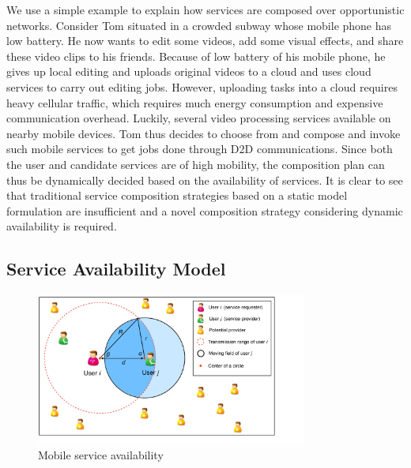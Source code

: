 \documentclass[journal]{IEEEtran}
\begin{document}

We use a simple example to explain how services are composed over opportunistic networks.
Consider Tom situated in a crowded subway whose mobile phone has low battery. 
He now wants to edit some videos, add some visual effects, and share these video clips to his friends.
Because of low battery of his mobile phone, he gives up local editing and uploads original videos to a cloud and uses cloud services to carry out editing jobs. However, uploading tasks into a cloud requires heavy cellular traffic, which requires much energy consumption and expensive communication overhead.
Luckily, several video processing services available on nearby mobile devices. Tom thus decides to choose from and compose and invoke such mobile services to get jobs done through D2D communications. 
Since both the user and candidate services are of high mobility, the composition plan can thus be dynamically decided based on the availability of services.  It is clear to see that traditional service composition strategies based on a static model formulation are insufficient and a novel composition strategy considering dynamic availability is required.

\subsection{Service Availability Model}

\begin{figure}[!t]
\centering
\includegraphics[width=3.5in]{./img/pic3.pdf}
\caption{Mobile service availability}
\label{fig_sd}
\end{figure}
\end{document}
